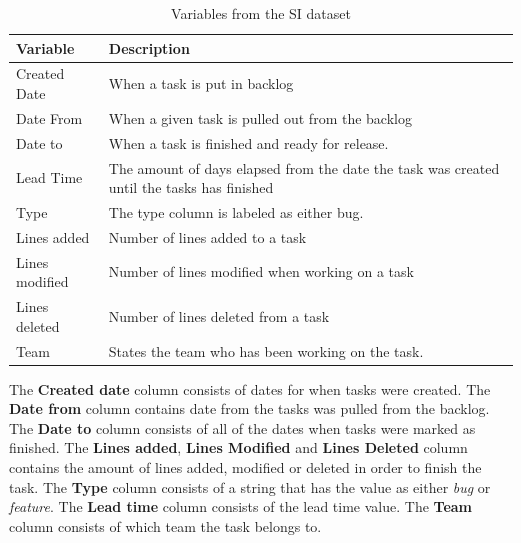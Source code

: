 \documentclass[UKenglish]{ifimaster}  %
\begin{document}
\begin{table}[!ht]
\begin{center}
\caption{Variables from the SI dataset}
    \begin{tabular}{| l | p{5cm} |}
    \hline
     \bf{Variable} & \bf{Description}\\ \hline
     Created Date & When a task is put in backlog \\ \hline
     Date From & When a given task is pulled out from the backlog\\ \hline
     Date to & When a task is finished and ready for release. \\ \hline
    Lead Time & The amount of days elapsed from the date the task was created until the tasks has finished  \\ \hline
   Type & The type column is labeled as either bug. \\ \hline
   Lines added & Number of lines added to a task \\ \hline
   Lines modified & Number of lines modified when working on a task \\ \hline
   Lines deleted & Number of lines deleted from a task \\
    \hline
    Team &States the team who has been working on the task.\\ \hline
    \end{tabular}
\label{IC} %
\end{center}
\end{table}

\newpage
The \textbf{Created date} column consists of dates for when tasks were created. 
The \textbf{Date from} column contains date from the tasks was pulled from the backlog. 
The \textbf{Date to} column consists of all of the dates when tasks were marked as finished.
The \textbf{Lines added}, \textbf{Lines Modified} and \textbf{Lines Deleted} column contains the amount of lines added, modified or deleted in order to finish the task.
The \textbf{Type} column consists of a string that has the value as either \textit{bug} or \textit{feature}.
The \textbf{Lead time} column consists of the lead time value. 
The \textbf{Team} column consists of which team the task belongs to. 
\end{document}

